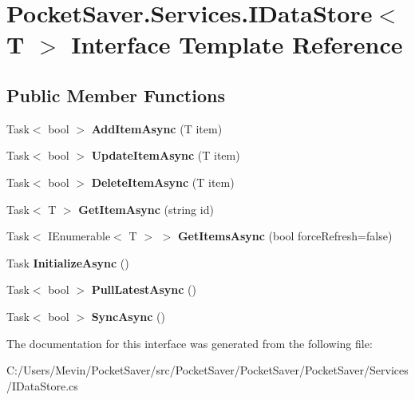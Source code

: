 \hypertarget{interface_pocket_saver_1_1_services_1_1_i_data_store}{}\section{Pocket\+Saver.\+Services.\+I\+Data\+Store$<$ T $>$ Interface Template Reference}
\label{interface_pocket_saver_1_1_services_1_1_i_data_store}
\subsection*{Public Member Functions}
\begin{DoxyCompactItemize}
\item 
\mbox{\label{interface_pocket_saver_1_1_services_1_1_i_data_store_a352d3b450114de4e698ba1c39c479e65}} 
Task$<$ bool $>$ {\bfseries Add\+Item\+Async} (T item)
\item 
\mbox{\label{interface_pocket_saver_1_1_services_1_1_i_data_store_aede96600f1b62b1524c953a1dc7aa82a}} 
Task$<$ bool $>$ {\bfseries Update\+Item\+Async} (T item)
\item 
\mbox{\label{interface_pocket_saver_1_1_services_1_1_i_data_store_a3ac0c2a4527346de3171d1dc9952b0a7}} 
Task$<$ bool $>$ {\bfseries Delete\+Item\+Async} (T item)
\item 
\mbox{\label{interface_pocket_saver_1_1_services_1_1_i_data_store_a35c05f2290db4c5d1a2658b2e640d532}} 
Task$<$ T $>$ {\bfseries Get\+Item\+Async} (string id)
\item 
\mbox{\label{interface_pocket_saver_1_1_services_1_1_i_data_store_a2c7f92ed596bfa467b57ec135f008e44}} 
Task$<$ I\+Enumerable$<$ T $>$ $>$ {\bfseries Get\+Items\+Async} (bool force\+Refresh=false)
\item 
\mbox{\label{interface_pocket_saver_1_1_services_1_1_i_data_store_a60e7759eb8483ebae451559003aa2dbb}} 
Task {\bfseries Initialize\+Async} ()
\item 
\mbox{\label{interface_pocket_saver_1_1_services_1_1_i_data_store_ad1a85284ff0d25e60454d37335905519}} 
Task$<$ bool $>$ {\bfseries Pull\+Latest\+Async} ()
\item 
\mbox{\label{interface_pocket_saver_1_1_services_1_1_i_data_store_a1d31fca2d28005ac878c1a16fbb16fa1}} 
Task$<$ bool $>$ {\bfseries Sync\+Async} ()
\end{DoxyCompactItemize}


The documentation for this interface was generated from the following file\+:\begin{DoxyCompactItemize}
\item 
C\+:/\+Users/\+Mevin/\+Pocket\+Saver/src/\+Pocket\+Saver/\+Pocket\+Saver/\+Pocket\+Saver/\+Services/I\+Data\+Store.\+cs\end{DoxyCompactItemize}
